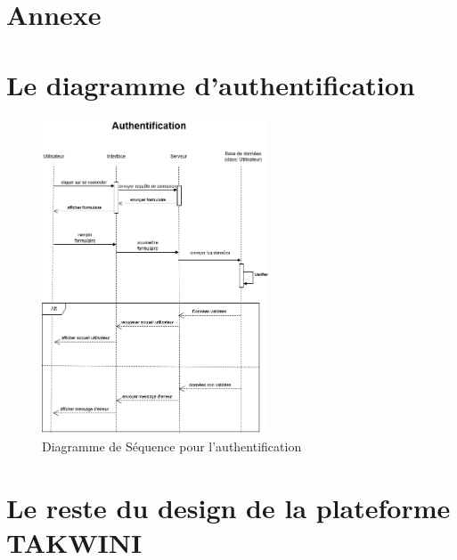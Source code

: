 \documentclass{article}
\begin{document}
\newpage
\section{Annexe}
\appendix
\section{Le diagramme d'authentification}
\label{annexe-auth}

\begin{figure}[H]
  \centering
  \includegraphics[width=0.6\textwidth]{authentification(1.2).drawio.png}
  \caption{Diagramme de Séquence pour l'authentification}
  \end{figure}


\section{Le reste du design de la plateforme TAKWINI}
\label{annexe-design}
\end{document}
